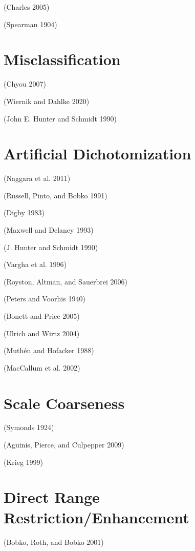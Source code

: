 \documentclass[
  letterpaper,
  DIV=11,
  numbers=noendperiod]{scrreprt}
\begin{document}
(Charles 2005)

(Spearman 1904)

\hypertarget{misclassification}{%
\chapter{Misclassification}\label{misclassification}}

(Chyou 2007)

(Wiernik and Dahlke 2020)

(John E. Hunter and Schmidt 1990)

\hypertarget{artificial-dichotomization}{%
\chapter{Artificial Dichotomization}\label{artificial-dichotomization}}

(Naggara et al. 2011)

(Russell, Pinto, and Bobko 1991)

(Digby 1983)

(Maxwell and Delaney 1993)

(J. Hunter and Schmidt 1990)

(Vargha et al. 1996)

(Royston, Altman, and Sauerbrei 2006)

(Peters and Voorhis 1940)

(Bonett and Price 2005)

(Ulrich and Wirtz 2004)

(Muthén and Hofacker 1988)

(MacCallum et al. 2002)

\hypertarget{scale-coarseness}{%
\chapter{Scale Coarseness}\label{scale-coarseness}}

(Symonds 1924)

(Aguinis, Pierce, and Culpepper 2009)

(Krieg 1999)

\hypertarget{direct-range-restrictionenhancement}{%
\chapter{Direct Range
Restriction/Enhancement}\label{direct-range-restrictionenhancement}}

(Bobko, Roth, and Bobko 2001)
\end{document}
